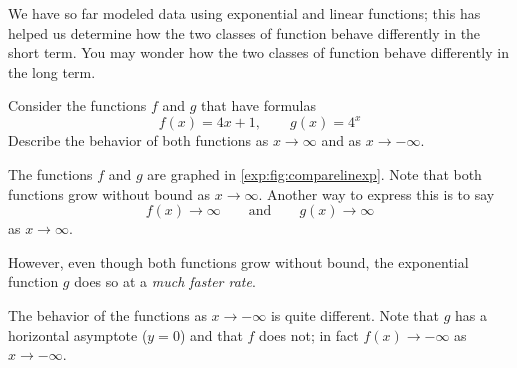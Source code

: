We have so far modeled data using exponential and linear functions; this
has helped us determine how the two classes of function behave differently 
in the short term. You may wonder how the two classes of function behave differently in the long term.
			
\begin{pccexample}\label{exp:ex:complinexp}
	Consider the functions $f$ and $g$ that have formulas
	\[
		f(x)=4x+1, \qquad g(x)=4^x
	\]
	Describe the behavior of both functions as $x\to\infty$ and as $x\to -\infty$.
	\begin{pccsolution}
		The functions $f$ and $g$ are graphed in \cref{exp:fig:comparelinexp}.
		Note that both functions grow without bound as $x\to\infty$. Another 
		way to express this is to say
		\[
			f(x)\to\infty \qquad\mathrm{and}\qquad g(x)\to\infty
		\]
		as $x\to\infty$.
																	
		However, even though both functions grow without bound, the exponential 
		function $g$ does so at a \emph{much faster rate}.
																	
		The behavior of the functions as $x\to-\infty$ is quite different.
		Note that $g$ has a horizontal asymptote ($y=0$) and that $f$ does not; in 
		fact $f(x)\to-\infty$ as $x\to-\infty$.
	\end{pccsolution}
\end{pccexample}
			
\begin{figure}[!htb]
	\centering
	\hfill
	\begin{minipage}{0.3\textwidth}
		\caption{}
		\label{exp:fig:comparelinexp}
	\end{minipage}
	\hfill
	\begin{minipage}{0.3\textwidth}
		\caption{}
		\label{exp:fig:comparelinexpmn}
	\end{minipage}
	\hfill\null
\end{figure}
			
